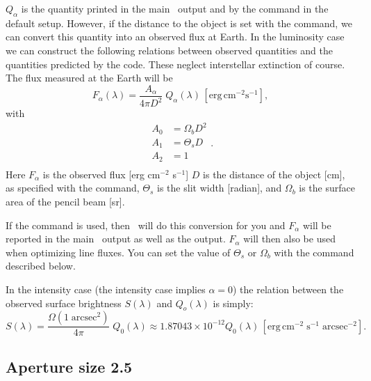 $Q_\alpha$ is the quantity printed in the main \Cloudy\ output and by the
 command in the default setup. However, if the
distance to the object is set with the  command,
we can convert this quantity into an observed flux at Earth.
In the luminosity case we can construct the following relations between observed
quantities and the quantities predicted by the code.  These neglect
interstellar extinction of course.
The flux measured at the Earth will be
\begin{equation}
F_\alpha  \left( \lambda  \right) = \frac{{A_\alpha  }}{{4\pi D^2
}}\;Q_\alpha  \left( \lambda  \right)\, [\mathrm{erg\, cm}^{-2} \mathrm{s}^{-1}],%
\label{flux_conversion}
\end{equation}
with
\begin{equation}
\label{flux_conv_aperfac}
\begin{array}{ll}
 A_0&  = \Omega _b D^2  \\
 A_1&  = \Theta _s D \\
 A_2&  = 1 \\
 \end{array}
.%
\end{equation}
Here $F_\alpha $ is the observed flux
[erg cm$^{-2}$ s$^{-1}$]
$D$ is the distance of the object [cm],
as specified with the  command,
$\Theta_s$ is the slit width [radian],
and $\Omega_b$ is the surface area of the pencil beam [sr].

If the  command is used, then \Cloudy\ will
do this conversion for you and $F_\alpha$ will be reported in the main \Cloudy\
output as well as the  output. $F_\alpha$ will then also be
used when optimizing line fluxes. You can set the value of $\Theta_s$ or $\Omega_b$
with the \cdCommand{aperture size} command described below.

In the intensity case (the intensity case implies $\alpha  = 0$)
the relation
between the observed surface brightness
$S(\lambda )$ and $Q_o(\lambda )$ is simply:
\begin{equation}
S\left( \lambda  \right) = \frac{{\Omega \left( {1\;{\mathrm{arcsec}}^2 }
\right)}}{{4\pi }}\;Q_0 \left( \lambda  \right) \approx 1.87043 \times 10^{
- 12} Q_0 \left( \lambda  \right)
\, [\mathrm{erg\, cm}^{-2}\; \mathrm{s}^{-1}\; \mathrm{arcsec}^{-2}] .
\end{equation}

\subsection{Aperture size 2.5}

